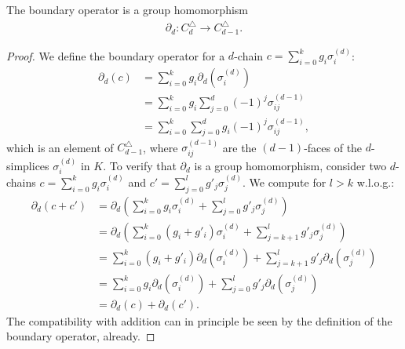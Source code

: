 \begin{lemma}
	The boundary operator is a group homomorphism
	\begin{align}
		\partial_d: C^{\triangle}_{d} \to C^{\triangle}_{d-1}. 
	\end{align}
\end{lemma}

\begin{proof}
	We define the boundary operator for a \( d \)-chain \( c = \sum_{i=0}^{k} g_{i} \sigma_{i}^{(d)} \):
	\begin{align}
		\partial_d(c) & = \sum_{i=0}^{k} g_{i} \partial_d(\sigma_{i}^{(d)}) \nonumber \\
		            & = \sum_{i=0}^{k} g_{i} \sum_{j=0}^{d} (-1)^{j} \sigma_{ij}^{(d-1)} \nonumber \\
		            & = \sum_{i=0}^{k} \sum_{j=0}^{d} g_{i} (-1)^{j} \sigma_{ij}^{(d-1)}, 
	\end{align}
	which is an element of \( C^{\triangle}_{d-1} \), where \( \sigma_{ij}^{(d-1)} \) are the \( (d-1) \)-faces of the \( d \)-simplices \( \sigma_{i}^{(d)} \) in \( K \). To verify that \( \partial_d \) is a group homomorphism, consider two \( d \)-chains \( c = \sum_{i=0}^{k} g_{i} \sigma_{i}^{(d)} \) and \( c' = \sum_{j=0}^{l} g'_{j} \sigma_{j}^{(d)} \). We compute for $l > k$ w.l.o.g.:
	\begin{align}
		\partial_d(c + c') & = \partial_d( \sum_{i=0}^{k} g_{i} \sigma_{i}^{(d)} + \sum_{j=0}^{l} g'_{j} \sigma_{j}^{(d)} ) \nonumber\\
		                 & = \partial_d( \sum_{i=0}^{k} (g_{i} + g'_i) \sigma_{i}^{(d)} + \sum_{j=k+1}^{l} g'_{j} \sigma_{j}^{(d)} ) \nonumber\\
		                 & = \sum_{i=0}^{k} (g_{i}+g'_i) \partial_d(\sigma_{i}^{(d)}) + \sum_{j=k+1}^{l} g'_{j} \partial_d(\sigma_{j}^{(d)})    \nonumber\\
		                 & = \sum_{i=0}^{k} g_{i} \partial_d(\sigma_{i}^{(d)}) + \sum_{j=0}^{l} g'_{j} \partial_d(\sigma_{j}^{(d)}) \nonumber\\
		                 & = \partial_d(c) + \partial_d(c').                                                                           
	\end{align}
	The compatibility with addition can in principle be seen by the definition of the boundary operator, already.
\end{proof}

